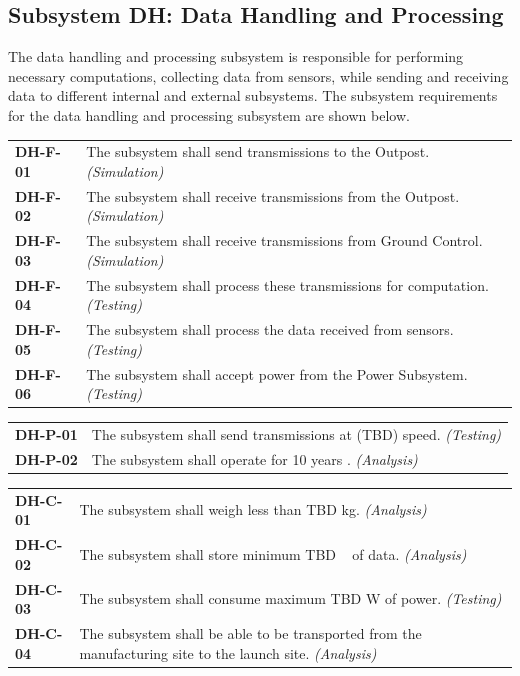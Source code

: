 \documentclass[12pt, letterpaper]{article}
\begin{document}
\subsection{Subsystem DH: Data Handling and Processing}
The data handling and processing subsystem is responsible for performing necessary computations, collecting data from sensors, while sending and receiving data to different internal and external subsystems. The subsystem requirements for the data handling and processing subsystem are shown below.
\vspace{-5pt}
\begin{longtable}{P{2cm}P{13.75cm}}
\textbf{DH-F-01}	& The subsystem shall send transmissions to the Outpost. \textit{(Simulation)}										\\
\textbf{DH-F-02}	& The subsystem shall receive transmissions from the Outpost. \textit{(Simulation)}									\\
\textbf{DH-F-03}	& The subsystem shall receive transmissions from Ground Control. \textit{(Simulation)}								\\
\textbf{DH-F-04}	& The subsystem shall process these transmissions for computation. \textit{(Testing)}									\\
\textbf{DH-F-05}	& The subsystem shall process the data received from sensors. \textit{(Testing)}										\\
\textbf{DH-F-06}	& The subsystem shall accept power from the Power Subsystem. \textit{(Testing)}										\\
\end{longtable}
\vspace{-10pt}
\begin{longtable}{P{2cm}P{13.75cm}}
\textbf{DH-P-01}	& The subsystem shall send transmissions at (TBD) speed. \textit{(Testing)}											\\
\textbf{DH-P-02}	& The subsystem shall operate for 10 years \cite{RFP}. \textit{(Analysis)}										\\
\end{longtable}
\vspace{-10pt}
\begin{longtable}{P{2cm}P{13.75cm}}
\textbf{DH-C-01}	& The subsystem shall weigh less than TBD \si{\kg}. \textit{(Analysis)}													\\
\textbf{DH-C-02}	& The subsystem shall store minimum TBD \si{\giga\byte} of data. \textit{(Analysis)}									\\
\textbf{DH-C-03}	& The subsystem shall consume maximum TBD \si{\watt} of power. \textit{(Testing)}								\\
\textbf{DH-C-04}	& The subsystem shall be able to be transported from the manufacturing site to the launch site. \textit{(Analysis)}	\\
\end{longtable}
\end{document}

